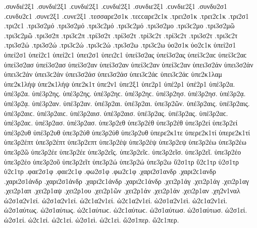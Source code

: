 {.συνδιέ2ξ1 .συνδιέ2ξ1 .ϲυνδιέ2ξ1 .ϲυνδιέ2ξ1   %
.συνδιε2ξ1 .ϲυνδιε2ξ1   %
.συνδυ2σ1 .ϲυνδυ2ϲ1   %
.συνε2ξ1 .ϲυνε2ξ1   %
.τεσσαρε2σ1κ .τεϲϲαρε2ϲ1κ   %
.τρει2σ1κ .τρει2ϲ1κ   %
.τρι2σ1 .τρι2ϲ1 
.τρι3σ2μό .τρι3σ2μό .τρι3ϲ2μό .τρι3ϲ2μό   %
.τρι3σ2μο .τρι3ϲ2μο 
.τρι3σ2μῶ .τρι3ϲ2μῶ 
.τρι3σ2π .τρι3ϲ2π   %
.τρί3σ2τ .τρί3σ2τ .τρί3ϲ2τ .τρί3ϲ2τ   %
.τρι3σ2τ .τρι3ϲ2τ 
.τρι3σ2ώ .τρι3σ2ώ .τρι3ϲ2ώ .τρι3ϲ2ώ   %
.τρι3σ2ω .τρι3ϲ2ω 
ὑο2σ1κ ὑο2ϲ1κ   %
ὑπεί2σ1 ὑπεί2σ1 ὑπεί2ϲ1 ὑπεί2ϲ1 
ὑπει2σ1 ὑπει2ϲ1 
ὑπεί3σ2ας ὑπεί3σ2ας ὑπεί3ϲ2αϲ ὑπεί3ϲ2αϲ   %
ὑπεί3σ2ασ ὑπεί3σ2ασ 
ὑπεί3σ2αν ὑπεί3σ2αν ὑπεί3ϲ2αν ὑπεί3ϲ2αν 
ὑπει3σ2άν ὑπει3σ2άν ὑπει3ϲ2άν ὑπει3ϲ2άν 
ὑπει3σ2άσ ὑπει3σ2άσ ὑπει3ϲ2άϲ ὑπει3ϲ2άϲ 
ὑπε2κ1λαμ   %
ὑπε2κ1λήψ ὑπε2κ1λήψ   %
ὑπε2κ1τ   %
ὑπε2ν1 
ὑπε2ξ1 
ὑπε2ρ1 
ὑπέ2ρ1 ὑπέ2ρ1 
ὑπέ3ρ2α. ὑπέ3ρ2α.   %
ὑπέ3ρ2ης. ὑπέ3ρ2ης. ὑπέ3ρ2ηϲ. ὑπέ3ρ2ηϲ. 
ὑπέ3ρ2ησ. ὑπέ3ρ2ησ. 
ὑπέ3ρ2ᾳ. ὑπέ3ρ2ᾳ. 
ὑπέ3ρ2αν. ὑπέ3ρ2αν. 
ὑπέ3ρ2αι. ὑπέ3ρ2αι. 
ὑπε3ρ2ῶν. 
ὑπέ3ρ2αις. ὑπέ3ρ2αις. ὑπέ3ρ2αιϲ. ὑπέ3ρ2αιϲ. 
ὑπέ3ρ2αισ. ὑπέ3ρ2αισ. 
ὑπέ3ρ2ας. ὑπέ3ρ2ας. ὑπέ3ρ2αϲ. ὑπέ3ρ2αϲ. 
ὑπέ3ρ2ασ. ὑπέ3ρ2ασ. 
ὑπε3ρ2εθ   %
ὑπε3ρ2έθ ὑπε3ρ2έθ 
ὑπε3ρ2εί ὑπε3ρ2εί   %
ὑπέ3ρ2υθ ὑπέ3ρ2υθ   %
ὑπε3ρ2ύθ ὑπε3ρ2ύθ 
ὑπε3ρ2υθ   %
ὑπερε2κ1τε   %
ὑπερε2κ1τί ὑπερε2κ1τί   %
ὑπε3ρ2έπτ ὑπε3ρ2έπτ   %
ὑπε3ρ2επτ 
ὑπε3ρ2έψ ὑπε3ρ2έψ 
ὑπε3ρ2εψ 
ὑπε3ρ2έω ὑπε3ρ2έω   %
ὑπε3ρ2ῶ 
ὑπε3ρ2έε ὑπε3ρ2έε 
ὑπε3ρ2εῖς. ὑπε3ρ2εῖϲ. 
ὑπε3ρ2εῖσ. 
ὑπε3ρ2εῖ. 
ὑπε3ρ2έο ὑπε3ρ2έο 
ὑπε3ρ2οῦ 
ὑπε3ρ2εῖτ 
ὑπε3ρ2ώ ὑπε3ρ2ώ   %
ὑπε3ρ2ω   %
ὕ2σ1τρ ὕ2ϲ1τρ   %
ὑ2σ1τρ ὑ2ϲ1τρ   %
.φαε2σ1φ .φαε2ϲ1φ   %
.φω2σ1φ .φω2ϲ1φ   %
.χαρι2σ1ανδρ .χαρι2ϲ1ανδρ   %
.χαρι2σ1άνδρ .χαρι2σ1άνδρ .χαρι2ϲ1άνδρ .χαρι2ϲ1άνδρ 
.χει2ρ1άγ .χει2ρ1άγ   %
.χει2ρ1αγ   %
.χει2ρ1απ   %
.χει2ρ1αψ   %
.χει2ρ1ου   %
.χει2ρ1ῶν   %
.χει2ρ1άν .χει2ρ1άν 
.χει2ρ1αν 
.χη2ν1ναλ   %
ὡ2σ1α2ν1εί. ὡ2σ1α2ν1εί. ὡ2ϲ1α2ν1εί. ὡ2ϲ1α2ν1εί.   %
ὡ2σ1α2ν1εὶ. ὡ2ϲ1α2ν1εὶ. 
ὡ2σ1αύτως. ὡ2σ1αύτως. ὡ2ϲ1αύτωϲ. ὡ2ϲ1αύτωϲ.   %
ὡ2σ1αύτωσ. ὡ2σ1αύτωσ. 
ὡ2σ1εί. ὡ2σ1εί. ὡ2ϲ1εί. ὡ2ϲ1εί.   %
ὡ2σ1εὶ. ὡ2ϲ1εὶ. 
ὥ2σ1περ. ὥ2ϲ1περ.   %
}
